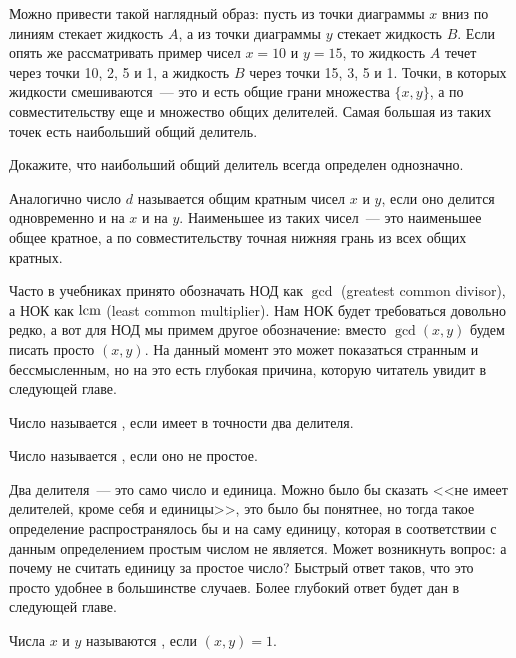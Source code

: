 Можно привести такой наглядный образ: пусть из точки диаграммы $x$ вниз по линиям стекает жидкость $A$, а из точки диаграммы $y$ стекает жидкость $B$. Если опять же рассматривать пример чисел $x=10$ и $y=15$, то жидкость $A$ течет через точки 10, 2, 5 и 1, а жидкость $B$ через точки 15, 3, 5 и 1. Точки, в которых жидкости смешиваются~--- это и есть общие грани множества $\{x, y\}$, а по совместительству еще и множество общих делителей. Самая большая из таких точек есть наибольший общий делитель.

\begin{exercise}
Докажите, что наибольший общий делитель всегда определен однозначно.
\end{exercise}

Аналогично число $d$ называется общим кратным чисел $x$ и $y$, если оно делится одновременно и на $x$ и на $y$. Наименьшее из таких чисел~--- это наименьшее общее кратное, а по совместительству точная нижняя грань из всех общих кратных.

Часто в учебниках принято обозначать НОД как $\gcd$ (greatest common divisor), а НОК как $\operatorname{lcm}$ (least common multiplier). Нам НОК будет требоваться довольно редко, а вот для НОД мы примем другое обозначение: вместо $\gcd(x, y)$ будем писать просто $(x, y)$. На данный момент это может показаться странным и бессмысленным, но на это есть глубокая причина, которую читатель увидит в следующей главе.

\begin{definition}
Число называется , если имеет в точности два делителя.
\end{definition}

\begin{definition}
Число называется , если оно не простое.
\end{definition}

Два делителя~--- это само число и единица. Можно было бы сказать <<не имеет делителей, кроме себя и единицы>>, это было бы понятнее, но тогда такое определение распространялось бы и на саму единицу, которая в соответствии с данным определением простым числом не является. Может возникнуть вопрос: а почему не считать единицу за простое число? Быстрый ответ таков, что это просто удобнее в большинстве случаев. Более глубокий ответ будет дан в следующей главе.

\begin{definition}
Числа $x$ и $y$ называются , если $(x, y) = 1$.
\end{definition}


